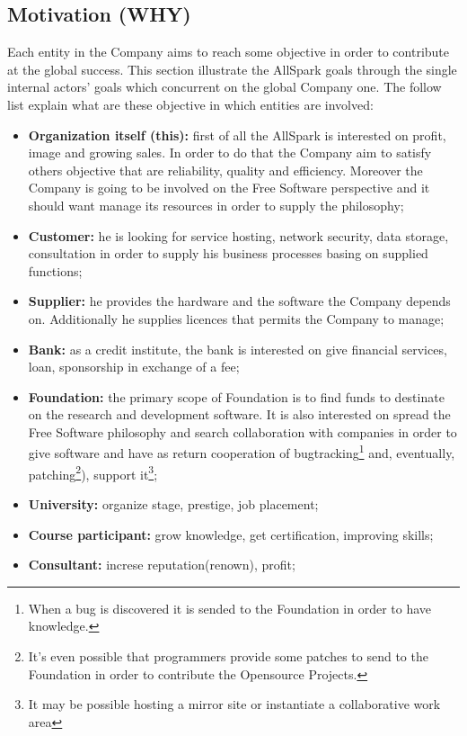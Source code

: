 \subsection{Motivation (WHY)}
\label{subsec:scope[Motivation]}
Each entity in the Company aims to reach some objective in order to contribute at the global success. This section illustrate the AllSpark goals through the single internal actors' goals which concurrent on the global Company one. The follow list explain what are these objective in which entities are involved:
\begin{itemize}
 \item {\bf Organization itself (this):} first of all the AllSpark is interested on profit, image and growing sales. In order to do that the Company aim to satisfy others objective that are reliability, quality and efficiency. Moreover the Company is going to be involved on the Free Software perspective and it should want manage its resources in order to supply the philosophy;
 \item {\bf Customer:} he is looking for service hosting, network security, data storage, consultation in order to supply his business processes basing on supplied functions;
 \item {\bf Supplier:} he provides the hardware and the software the Company depends on. Additionally he supplies licences that permits the Company to manage;
 \item {\bf Bank:} as a credit institute, the bank is interested on give financial services, loan, sponsorship in exchange of a fee;
 \item {\bf Foundation:} the primary scope of Foundation is to find funds to destinate on the research and development software. It is also interested on spread the Free Software philosophy and search collaboration with companies in order to give software and have as return cooperation of bugtracking\footnote{When a bug is discovered it is sended to the Foundation in order to have knowledge.} and, eventually, patching\footnote{It's even possible that programmers provide some patches to send to the Foundation in order to contribute the Opensource Projects.}), support it\footnote{It may be possible hosting a mirror site or instantiate a collaborative work area};
 \item {\bf University:} organize stage, prestige, job placement;
 \item {\bf Course participant:} grow knowledge, get certification, improving skills;
 \item {\bf Consultant:} increse reputation(renown), profit;
\end{itemize}

